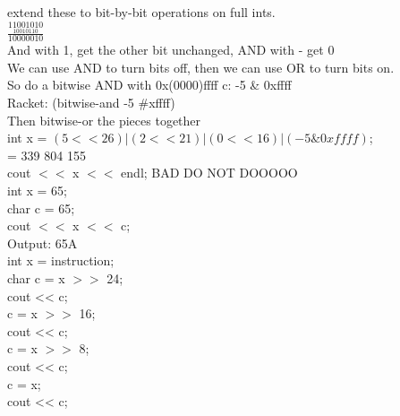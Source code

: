\documentclass[12pt]{article}
\begin{document}
	extend these to bit-by-bit operations on full ints.\\
	
	$\frac{\underset{10010110}{11001010}}{10000010}$\\
	And with 1, get the other bit unchanged, AND with - get 0\\
	We can use AND to turn bits off, then we can use OR to turn bits on.\\
	
	So do a bitwise AND with 0x(0000)ffff
	c: -5 \& 0xffff\\
	Racket: (bitwise-and -5 \#xffff)\\
	
	Then bitwise-or the pieces together\\
	int x = $(5<<26)|(2<<21)|(0<<16)|(-5 \& 0xffff)$;\\
	= 339 804 155\\
	cout $<<$ x $<<$ endl; BAD DO NOT DOOOOO \\
	
	int x = 65;\\
	char c = 65;\\
	
	cout $<<$ x $<<$ c;\\
	Output: 65A\\
	
	int x = instruction;\\
	char c = x $>>$ 24;\\
	cout << c;\\
	c = x $>>$ 16;\\
	cout << c;\\
	c = x $>>$ 8;\\
	cout << c;\\
	c = x;\\
	cout << c;\\
	
	
	
	
	
\end{document}
